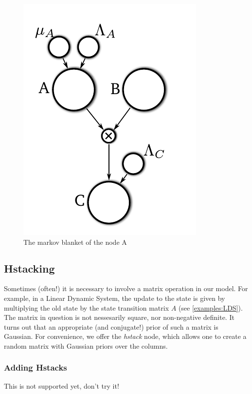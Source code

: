 \documentclass{article}
\newcommand{\<}{\langle}
\renewcommand{\>}{\rangle}
\begin{document}
\begin{figure}
\includegraphics{images/mult_markov}
\caption{The markov blanket of the node A}
\label{fig:mult_markov}
\end{figure}

\subsection{Hstacking}
\label{hstack}
Sometimes (often!) it is necessary to involve a matrix operation in our model.  For example, in a Linear Dynamic System, the update to the state is given by multiplying the old state by the state transition matrix $A$ (see \ref{examples:LDS}).  The matrix in question is not nessesarily square, nor non-negative definite. It turns out that an appropriate (and conjugate!) prior of such a matrix is Gaussian. For convenience, we offer the {\em hstack} node, which allows one to create a random matrix with Gaussian priors over the columns.  

\subsubsection{Adding Hstacks}
This is not supported yet, don't try it!
\end{document}

